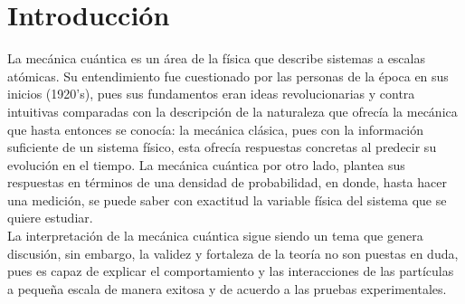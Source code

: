 \chapter{Introducción}\label{ch:introduccion}

La mecánica cuántica es un área de la física que describe sistemas a escalas atómicas. Su entendimiento fue cuestionado por las personas de la época en sus inicios (1920's), pues sus fundamentos eran ideas revolucionarias y contra intuitivas comparadas con la descripción de la naturaleza que ofrecía la mecánica que hasta entonces se conocía: la mecánica clásica, pues con la información suficiente de un sistema físico, esta ofrecía respuestas concretas al predecir su evolución en el tiempo. La mecánica cuántica por otro lado, plantea sus respuestas en términos de una densidad de probabilidad, en donde, hasta hacer una medición, se puede saber con exactitud la variable física del sistema que se quiere estudiar.
\\
La interpretación de la mecánica cuántica sigue siendo un tema que genera discusión, sin embargo, la validez y fortaleza de la teoría no son puestas en duda, pues es capaz de explicar el comportamiento y las interacciones de las partículas a pequeña escala de manera exitosa y de acuerdo a las pruebas experimentales.
\\

